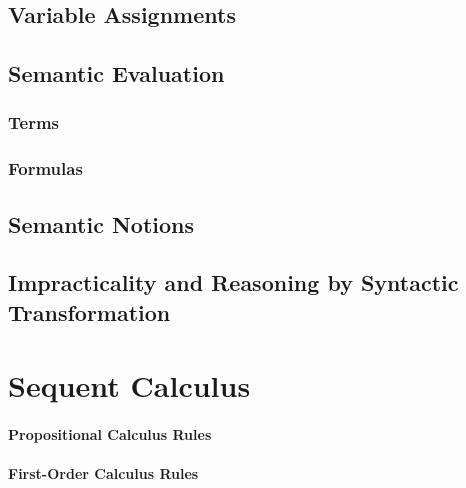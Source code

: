 \documentclass[a4paper, 11pt, accentcolor = tud3b]{tudreport}
\begin{document}
            \subsection{Variable Assignments} %

            \subsection{Semantic Evaluation} %

                \subsubsection{Terms} %

                \subsubsection{Formulas} %

            \subsection{Semantic Notions} %

            \subsection{Impracticality and Reasoning by Syntactic Transformation} %

        \section{Sequent Calculus} %

            \paragraph{Propositional Calculus Rules} %

            \paragraph{First-Order Calculus Rules} %
\end{document}
